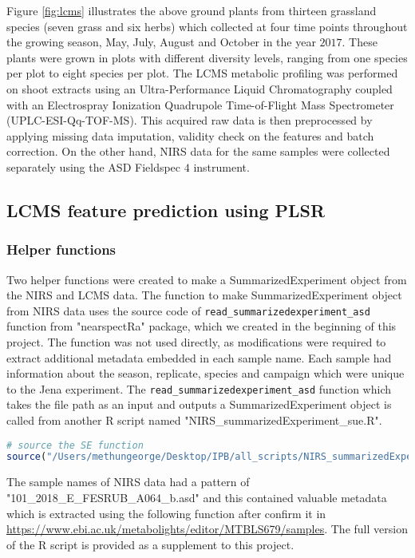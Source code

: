 \documentclass[12pt,a4paper]{report}
\begin{document}
Figure \ref{fig:lcms} illustrates the above ground plants from thirteen grassland species (seven grass and six herbs) which collected at four time points throughout the growing season, May, July, August and October in the year $2017$. These plants were grown in plots with different diversity levels, ranging from one species per plot to eight species per plot. The LCMS metabolic profiling was performed on shoot extracts using an Ultra-Performance Liquid Chromatography coupled with an Electrospray Ionization Quadrupole Time-of-Flight Mass Spectrometer (UPLC-ESI-Qq-TOF-MS). This acquired raw data is then preprocessed by applying missing data imputation, validity check on the features and batch correction. On the other hand, NIRS data for the same samples were collected separately using the ASD Fieldspec $4$ instrument. \\



\subsection{LCMS feature prediction using PLSR}
\subsubsection*{Helper functions}
Two helper functions were created to make a SummarizedExperiment object from the NIRS and LCMS data. The function to make SummarizedExperiment object from NIRS data uses the source code of \texttt{read\_summarizedexperiment\_asd} function from "nearspectRa" package, which we created in the beginning of this project. The function was not used directly, as modifications were required to extract additional metadata embedded in each sample name. Each sample had information about the season, replicate, species and campaign which were unique to the Jena experiment. The \texttt{read\_summarizedexperiment\_asd} function which takes the file path as an input and outputs a SummarizedExperiment object is called from another R script named "NIRS\_summarizedExperiment\_sue.R". \\

\begin{lstlisting}[language=R, style=mystyle]
# source the SE function
source("/Users/methungeorge/Desktop/IPB/all_scripts/NIRS_summarizedExperiment_sue.R")
\end{lstlisting}


The sample names of NIRS data had a pattern of "101\_2018\_E\_FESRUB\_A064\_b.asd" and this contained valuable metadata which is extracted using the following function after confirm it in \url{https://www.ebi.ac.uk/metabolights/editor/MTBLS679/samples}. The full version of the R script is provided as a supplement to this project.\\
\end{document}
